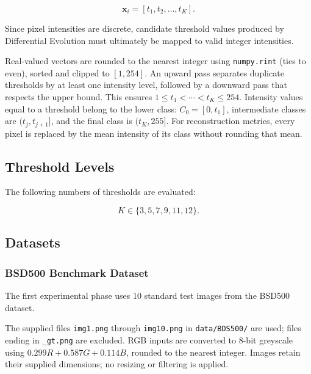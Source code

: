 \documentclass[review]{elsarticle}
\begin{document}
\begin{equation}
\mathbf{x}_i =
[t_1,t_2,\ldots,t_K].
\end{equation}

Since pixel intensities are discrete, candidate threshold values produced
by Differential Evolution must ultimately be mapped to valid integer
intensities.

Real-valued vectors are rounded to the nearest integer using
\texttt{numpy.rint} (ties to even), sorted and clipped to $[1,254]$.
An upward pass separates duplicate thresholds by at least one intensity
level, followed by a downward pass that respects the upper bound.
This ensures $1\leq t_1<\cdots<t_K\leq254$. Intensity values equal to a
threshold belong to the lower class: $C_0=[0,t_1]$, intermediate classes
are $(t_j,t_{j+1}]$, and the final class is $(t_K,255]$.
For reconstruction metrics, every pixel is replaced by the mean intensity
of its class without rounding that mean.



\subsection{Threshold Levels}

The following numbers of thresholds are evaluated:

\begin{equation}
K \in \{3,5,7,9,11,12\}.
\end{equation}


\subsection{Datasets}


\subsubsection{BSD500 Benchmark Dataset}

The first experimental phase uses 10 standard test images from the
BSD500 dataset.

The supplied files \texttt{img1.png} through \texttt{img10.png} in
\texttt{data/BDS500/} are used; files ending in \texttt{\_gt.png} are
excluded. RGB inputs are converted to 8-bit greyscale using
$0.299R+0.587G+0.114B$, rounded to the nearest integer. Images retain their
supplied dimensions; no resizing or filtering is applied.
\end{document}
